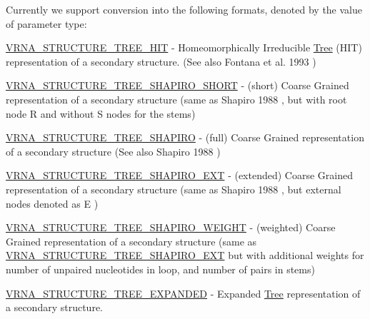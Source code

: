 Currently we support conversion into the following formats, denoted by the value of parameter {\ttfamily type\+:} 
\begin{DoxyItemize}
\item \mbox{\hyperlink{group__struct__utils__tree_ga3ad5609bc93ef20034c3ab989365c1f0}{V\+R\+N\+A\+\_\+\+S\+T\+R\+U\+C\+T\+U\+R\+E\+\_\+\+T\+R\+E\+E\+\_\+\+H\+IT}} -\/ Homeomorphically Irreducible \mbox{\hyperlink{structTree}{Tree}} (H\+IT) representation of a secondary structure. (See also Fontana et al. 1993 \cite{fontana:1993b})
\item \mbox{\hyperlink{group__struct__utils__tree_ga549e259a963d77e2d5b7e14083fc016e}{V\+R\+N\+A\+\_\+\+S\+T\+R\+U\+C\+T\+U\+R\+E\+\_\+\+T\+R\+E\+E\+\_\+\+S\+H\+A\+P\+I\+R\+O\+\_\+\+S\+H\+O\+RT}} -\/ (short) Coarse Grained representation of a secondary structure (same as Shapiro 1988 \cite{shapiro:1988}, but with root node {\ttfamily R} and without {\ttfamily S} nodes for the stems)
\item \mbox{\hyperlink{group__struct__utils__tree_ga4acd9991a0250ccd4cd44c4725b31927}{V\+R\+N\+A\+\_\+\+S\+T\+R\+U\+C\+T\+U\+R\+E\+\_\+\+T\+R\+E\+E\+\_\+\+S\+H\+A\+P\+I\+RO}} -\/ (full) Coarse Grained representation of a secondary structure (See also Shapiro 1988 \cite{shapiro:1988})
\item \mbox{\hyperlink{group__struct__utils__tree_ga8666a10982a4f7a26892066ff07b4b48}{V\+R\+N\+A\+\_\+\+S\+T\+R\+U\+C\+T\+U\+R\+E\+\_\+\+T\+R\+E\+E\+\_\+\+S\+H\+A\+P\+I\+R\+O\+\_\+\+E\+XT}} -\/ (extended) Coarse Grained representation of a secondary structure (same as Shapiro 1988 \cite{shapiro:1988}, but external nodes denoted as {\ttfamily E} )
\item \mbox{\hyperlink{group__struct__utils__tree_ga91f2e3a3a502d5445fd7fe5983a5fe92}{V\+R\+N\+A\+\_\+\+S\+T\+R\+U\+C\+T\+U\+R\+E\+\_\+\+T\+R\+E\+E\+\_\+\+S\+H\+A\+P\+I\+R\+O\+\_\+\+W\+E\+I\+G\+HT}} -\/ (weighted) Coarse Grained representation of a secondary structure (same as \mbox{\hyperlink{group__struct__utils__tree_ga8666a10982a4f7a26892066ff07b4b48}{V\+R\+N\+A\+\_\+\+S\+T\+R\+U\+C\+T\+U\+R\+E\+\_\+\+T\+R\+E\+E\+\_\+\+S\+H\+A\+P\+I\+R\+O\+\_\+\+E\+XT}} but with additional weights for number of unpaired nucleotides in loop, and number of pairs in stems)
\item \mbox{\hyperlink{group__struct__utils__tree_gab3b65489d1322da65d3a3e53242307ef}{V\+R\+N\+A\+\_\+\+S\+T\+R\+U\+C\+T\+U\+R\+E\+\_\+\+T\+R\+E\+E\+\_\+\+E\+X\+P\+A\+N\+D\+ED}} -\/ Expanded \mbox{\hyperlink{structTree}{Tree}} representation of a secondary structure.
\end{DoxyItemize}

